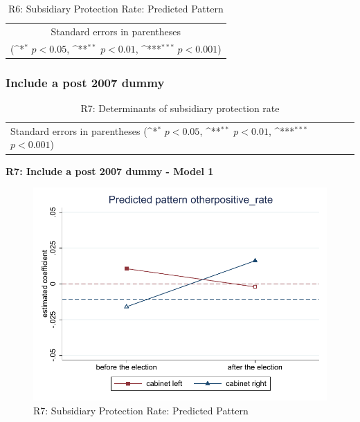 \documentclass[10pt,a4paper]{scrartcl}
\begin{document}
\begin{table}[!ht]\centering
	\footnotesize
	\renewcommand{\arraystretch}{1.2}
	\def\sym#1{\ifmmode^{#1}\else\(^{#1}\)\fi}
	\caption{R6: Subsidiary Protection Rate: Predicted Pattern}
	\begin{tabular}{l*{2}{c}}
		\hline\hline
		
		\hline\hline
		\multicolumn{3}{c}{\footnotesize Standard errors in parentheses} \\
		\multicolumn{3}{c}{\footnotesize (\sym{*} \(p<0.05\), \sym{**} \(p<0.01\), \sym{***} \(p<0.001\))} \\
	\end{tabular}
\end{table}




\clearpage
\FloatBarrier
\subsubsection{Include a post 2007 dummy}
\begin{table}[!ht]\centering
	\renewcommand{\arraystretch}{1.25}
	\small
	\def\sym#1{\ifmmode^{#1}\else\(^{#1}\)\fi}
	\caption{R7: Determinants of subsidiary protection rate}
	\begin{tabular}{l*{2}{c}}
		\hline\hline
		
		\hline\hline
		\multicolumn{3}{l}{\footnotesize Standard errors in parentheses (\sym{*} \(p<0.05\), \sym{**} \(p<0.01\), \sym{***} \(p<0.001\))}\\
	\end{tabular}
\end{table}

\clearpage
\textbf{R7: Include a post 2007 dummy - Model 1}
\begin{figure}[!ht]
	\centering
	\includegraphics[width=1\textwidth]{figures_edited/otherpositive_rate_graph1_R7.pdf}
	\caption{R7: Subsidiary Protection Rate: Predicted Pattern}
\end{figure}
\end{document}
